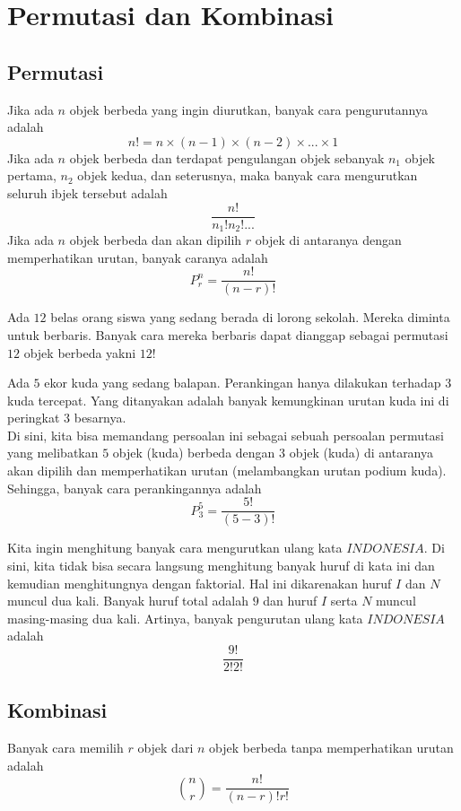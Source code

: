 \documentclass[11pt]{scrartcl}
\begin{document}
\section{Permutasi dan Kombinasi}
\subsection{Permutasi}
Jika ada $n$ objek berbeda yang ingin diurutkan, banyak cara pengurutannya adalah \[n! = n\times (n - 1) \times (n - 2) \times ... \times 1\]
Jika ada $n$ objek berbeda dan terdapat pengulangan objek sebanyak $n_1$ objek pertama, $n_2$ objek kedua, dan seterusnya, maka banyak cara mengurutkan seluruh ibjek tersebut adalah \[\dfrac{n!}{n_1!n_2!...}\]
Jika ada $n$ objek berbeda dan akan dipilih $r$ objek di antaranya dengan memperhatikan urutan, banyak caranya adalah \[P_r^n = \dfrac{n!}{(n - r)!}\]

\begin{example}
    Ada $12$ belas orang siswa yang sedang berada di lorong sekolah. Mereka diminta untuk berbaris. Banyak cara mereka berbaris dapat dianggap sebagai permutasi $12$ objek berbeda yakni $12!$
\end{example}

\begin{example}
    Ada $5$ ekor kuda yang sedang balapan. Perankingan hanya dilakukan terhadap $3$ kuda tercepat. Yang ditanyakan adalah banyak kemungkinan urutan kuda ini di peringkat $3$ besarnya. \\
    Di sini, kita bisa memandang persoalan ini sebagai sebuah persoalan permutasi yang melibatkan $5$ objek (kuda) berbeda dengan $3$ objek (kuda) di antaranya akan dipilih dan memperhatikan urutan (melambangkan urutan podium kuda). Sehingga, banyak cara perankingannya adalah \[P_3^5 = \dfrac{5!}{(5 - 3)!}\]
\end{example}

\begin{example}
    Kita ingin menghitung banyak cara mengurutkan ulang kata $INDONESIA$. Di sini, kita tidak bisa secara langsung menghitung banyak huruf di kata ini dan kemudian menghitungnya dengan faktorial. Hal ini dikarenakan huruf $I$ dan $N$ muncul dua kali. Banyak huruf total adalah $9$ dan huruf $I$ serta $N$ muncul masing-masing dua kali. Artinya, banyak pengurutan ulang kata $INDONESIA$ adalah \[\dfrac{9!}{2!2!}\]
\end{example}

\subsection{Kombinasi}
Banyak cara memilih $r$ objek dari $n$ objek berbeda tanpa memperhatikan urutan adalah \[\binom{n}{r} = \dfrac{n!}{(n - r)!r!}\]
\end{document}

